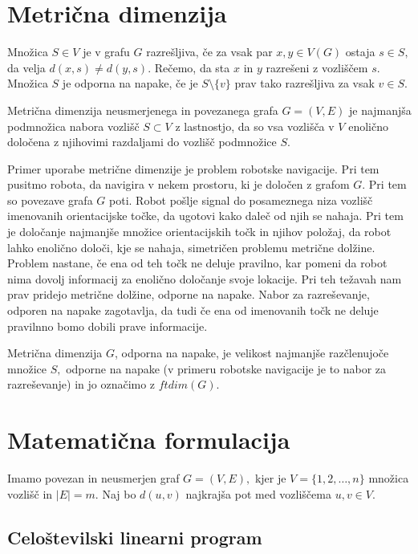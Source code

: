 \documentclass[a4paper,10pt, fleqn]{article}
\begin{document}
\section{Metrična dimenzija}

Množica $S \in V$ je v grafu $G$ razrešljiva, če za vsak par $x, y \in V(G)$ 
ostaja $s \in S,$ da velja $d(x, s) \neq d(y, s).$ Rečemo, da sta $x$ in $y$
razrešeni z vozliščem $s$. Množica $S$ je odporna na napake, če je 
$S \setminus \{v\}$ prav tako razrešljiva za vsak $v \in S.$ 

Metrična dimenzija neusmerjenega in povezanega grafa $G = (V, E)$ je najmanjša 
podmnožica nabora vozlišč $S \subset V$ z lastnostjo, da so vsa vozlišča v $V$ 
enolično določena z njihovimi razdaljami do vozlišč podmnožice $S$.

Primer uporabe metrične dimenzije je problem robotske navigacije. Pri tem pusitmo
robota, da navigira v nekem prostoru, ki je določen z grafom $G$. Pri tem so 
povezave grafa $G$ poti. Robot pošlje signal do posameznega niza vozlišč imenovanih 
orientacijske točke, da ugotovi kako daleč od njih se nahaja. Pri tem je določanje 
najmanjše množice orientacijskih točk in njihov položaj, da robot lahko enolično 
določi, kje se nahaja, simetričen problemu metrične dolžine. Problem nastane, 
če ena od teh točk ne deluje pravilno, kar pomeni da robot nima dovolj informacij 
za enolično določanje svoje lokacije. Pri teh težavah nam prav pridejo metrične 
dolžine, odporne na napake. 
Nabor za razreševanje, odporen na napake zagotavlja, da tudi če ena od imenovanih 
točk ne deluje pravilnno bomo dobili prave informacije.

Metrična dimenzija $G$, odporna na napake, je velikost najmanjše razčlenujoče 
množice $S,$ odporne na napake (v primeru robotske navigacije je to nabor za 
razreševanje) in jo označimo z $ftdim(G).$


\section{Matematična formulacija}

Imamo povezan in neusmerjen graf $G = (V, E),$ kjer je $V = \{1, 2, \ldots, n\}$
množica vozlišč in $\mid E \mid = m.$ Naj bo $d(u, v)$ najkrajša pot med vozliščema
$u, v \in V.$

\subsection{Celoštevilski linearni program}
\end{document}
